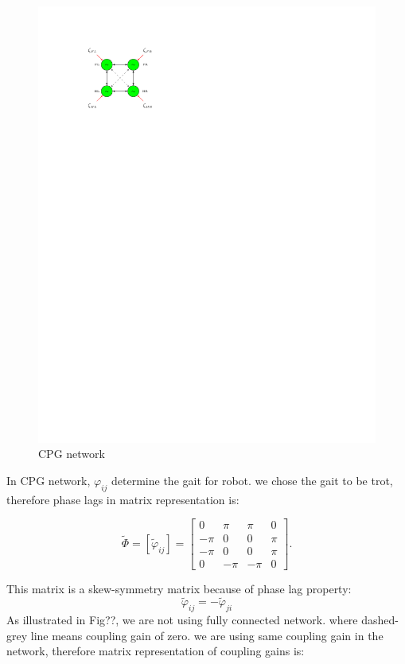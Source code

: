 \documentclass{article}
\begin{document}
\begin{figure}[thpb]
	\centering
		\centering
		\includegraphics[scale = 0.95]{schema_cropped.pdf}
		\centering
		\caption{CPG network}
		\label{fig:CPG Network}

\end{figure}


In CPG network, $\varphi_{ij}$ determine the gait for robot. we chose the gait to be trot, therefore phase lags in matrix representation is:

	\[ \tilde{\Phi} = [\tilde{\varphi}_{ij}]=\left[ \begin{array}{rrrr}
	0    & \pi & \pi  & 0   \\
	-\pi & 0   & 0    & \pi  \\
	-\pi & 0   & 0    & \pi   \\
	0    & -\pi&-\pi  & 0 
	\end{array} \right].\]
	
This matrix is a skew-symmetry matrix because of phase lag property: $$\tilde{\varphi}_{ij} = - \tilde{\varphi}_{ji}$$  
As illustrated in Fig??, we are not using fully connected network. where dashed-grey line means coupling gain of zero.
we are using same coupling gain in the network, therefore matrix representation of coupling gains is:
 
\end{document}
